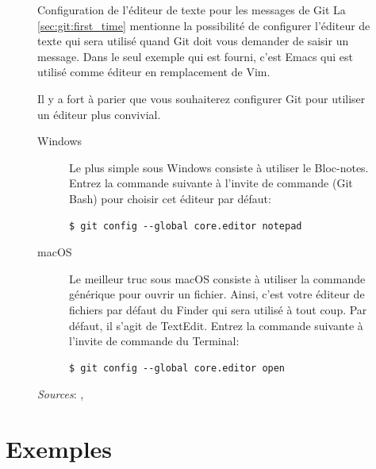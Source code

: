 \begin{figure}[t]
  \begin{emphbox}{\mdseries Configuration de l'éditeur de texte pour
      les messages de Git}
    La \autoref{sec:git:first_time} mentionne la possibilité de
    configurer l'éditeur de texte qui sera utilisé quand Git doit vous
    demander de saisir un message. Dans le seul exemple qui est
    fourni, c'est Emacs qui est utilisé comme éditeur en remplacement
    de Vim.

    Il y a fort à parier que vous souhaiterez configurer Git pour
    utiliser un éditeur plus convivial.

    \begin{description}
    \item[Windows]
    Le plus simple sous Windows consiste à utiliser le Bloc-notes.
    Entrez la commande suivante à l'invite de commande (Git Bash) pour
    choisir cet éditeur par défaut:
    \begin{Schunk}
\begin{Verbatim}
$ git config --global core.editor notepad
\end{Verbatim}
    \end{Schunk}%

    \item[macOS]
    Le meilleur truc sous macOS consiste à utiliser la commande
    générique  pour ouvrir un fichier. Ainsi, c'est votre
    éditeur de fichiers par défaut du Finder qui sera utilisé à tout
    coup. Par défaut, il s'agit de TextEdit. Entrez la commande
    suivante à l'invite de commande du Terminal:
    \begin{Schunk}
\begin{Verbatim}
$ git config --global core.editor open
\end{Verbatim}
    \end{Schunk}
  \end{description}

    \emph{Sources}:
    ,
  \end{emphbox}
  \label{fig:colloration:editeur}
\end{figure}


\section{Exemples}
\label{sec:collaboration:exemples}

